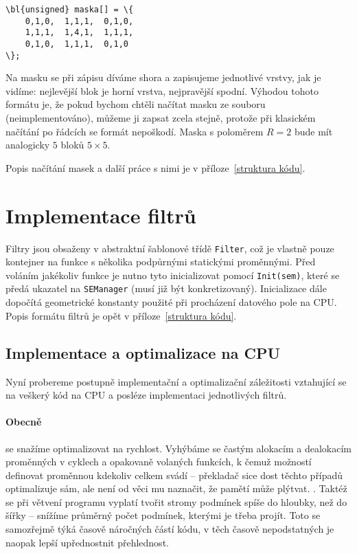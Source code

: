     \begin{Verbatim}[commandchars = \\\{\}]
\bl{unsigned} maska[] = \{
    0,1,0,  1,1,1,  0,1,0,
    1,1,1,  1,4,1,  1,1,1,
    0,1,0,  1,1,1,  0,1,0
\};
    \end{Verbatim}

    Na masku se při zápisu díváme shora a zapisujeme jednotlivé vrstvy, jak je vidíme: nejlevější blok je horní vrstva, nejpravější spodní. Výhodou tohoto formátu je, že pokud bychom chtěli načítat masku ze souboru (neimplementováno), můžeme ji zapsat zcela stejně, protože při klasickém načítání po řádcích se formát nepoškodí. Maska s poloměrem $R = 2$ bude mít analogicky $5$ bloků $5\times 5$.

    Popis načítání masek a další práce s nimi je v příloze~\ref{struktura kódu}.

    \section{Implementace filtrů}

    Filtry jsou obsaženy v abstraktní šablonové třídě {\tt Filter}, což je vlastně pouze kontejner na funkce s několika podpůrnými statickými proměnnými. Před voláním jakékoliv funkce je nutno tyto inicializovat pomocí {\tt Init(sem)}, které se předá ukazatel na {\tt SEManager} (musí již být konkretizovaný). Inicializace dále dopočítá geometrické konstanty použité při procházení datového pole na CPU. Popis formátu filtrů je opět v příloze~\ref{struktura kódu}.

    \subsection{Implementace a optimalizace na CPU}

        Nyní probereme postupně implementační a optimalizační záležitosti vztahující se na veškerý kód na CPU a posléze implementaci jednotlivých filtrů.

        \paragraph{Obecně} se snažíme optimalizovat na rychlost. Vyhýbáme se častým alokacím a dealokacím proměnných v cyklech a opakovaně volaných funkcích, k čemuž \Cpp možností definovat proměnnou kdekoliv celkem svádí -- překladač sice dost těchto případů optimalizuje sám, ale není od věci mu naznačit, že pamětí může plýtvat. . Taktéž se při větvení programu vyplatí tvořit stromy podmínek spíše do hloubky, než do šířky -- snížíme průměrný počet podmínek, kterými je třeba projít. Toto se samozřejmě týká časově náročných částí kódu, v těch časově nepodstatných je naopak lepší upřednostnit přehlednost. 

